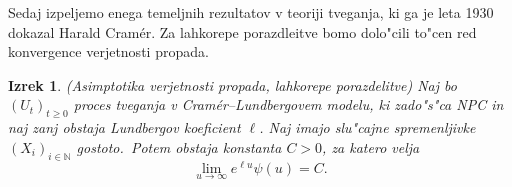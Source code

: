 \documentclass[12pt, a4paper, reqno]{amsart}
\theoremstyle{definition}
\theoremstyle{plain}
\newtheorem{izrek}[definicija]{Izrek}
\newcommand{\N}{\mathbb{N}}
\newcommand{\1}{\mathds{1}}
\begin{document}
            Sedaj izpeljemo enega temeljnih rezultatov v teoriji tveganja, ki ga je leta 1930 dokazal Harald 
            Cramér. Za lahkorepe porazdleitve bomo dolo"cili to"cen red konvergence verjetnosti propada.

            \begin{izrek}(Asimptotika verjetnosti propada, lahkorepe porazdelitve)
                Naj bo $(U_t)_{t\geq0}$ proces tveganja v Cramér--Lundbergovem modelu, ki zado"s"ca NPC in 
                naj zanj obstaja Lundbergov koeficient $\ell$. Naj imajo slu"cajne spremenljivke 
                $(X_i)_{i\in\N}$ gostoto.\ Potem obstaja konstanta $C>0$, za katero velja 
                \begin{equation*}
                    \lim_{u\to\infty}e^{\ell u}\psi(u) = C.
                \end{equation*}
                \label{izr:CramerjevaMeja}
            \end{izrek}
\end{document}
